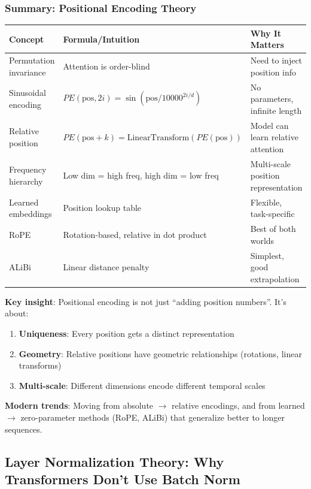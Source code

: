 \subsubsection{Summary: Positional Encoding Theory}

\begin{center}
\begin{tabular}{lll}
\hline
\textbf{Concept} & \textbf{Formula/Intuition} & \textbf{Why It Matters} \\
\hline
Permutation invariance & Attention is order-blind & Need to inject position info \\
Sinusoidal encoding & $PE(\text{pos}, 2i) = \sin(\text{pos}/10000^{2i/d})$ & No parameters, infinite length \\
Relative position & $PE(\text{pos}+k) = \text{LinearTransform}(PE(\text{pos}))$ & Model can learn relative attention \\
Frequency hierarchy & Low dim = high freq, high dim = low freq & Multi-scale position representation \\
Learned embeddings & Position lookup table & Flexible, task-specific \\
RoPE & Rotation-based, relative in dot product & Best of both worlds \\
ALiBi & Linear distance penalty & Simplest, good extrapolation \\
\hline
\end{tabular}
\end{center}

\textbf{Key insight}: Positional encoding is not just ``adding position numbers''. It's about:
\begin{enumerate}
\item \textbf{Uniqueness}: Every position gets a distinct representation
\item \textbf{Geometry}: Relative positions have geometric relationships (rotations, linear transforms)
\item \textbf{Multi-scale}: Different dimensions encode different temporal scales
\end{enumerate}

\textbf{Modern trends}: Moving from absolute $\to$ relative encodings, and from learned $\to$ zero-parameter methods (RoPE, ALiBi) that generalize better to longer sequences.

\subsection{Layer Normalization Theory: Why Transformers Don't Use Batch Norm}


